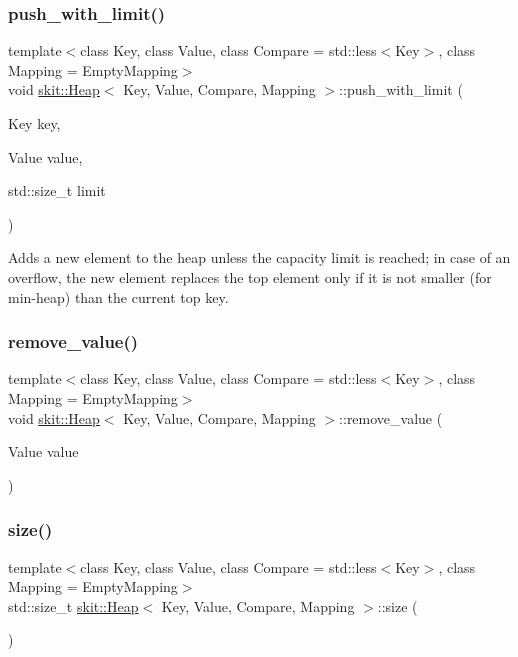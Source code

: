 \subsubsection{\texorpdfstring{push\+\_\+with\+\_\+limit()}{push\_with\_limit()}}
{\footnotesize\ttfamily template$<$class Key, class Value, class Compare = std\+::less$<$\+Key$>$, class Mapping = Empty\+Mapping$>$ \\
void \hyperlink{classskit_1_1Heap}{skit\+::\+Heap}$<$ Key, Value, Compare, Mapping $>$\+::push\+\_\+with\+\_\+limit (\begin{DoxyParamCaption}\item[{Key}]{key,  }\item[{Value}]{value,  }\item[{std\+::size\+\_\+t}]{limit }\end{DoxyParamCaption})\hspace{0.3cm}{\ttfamily [inline]}}

Adds a new element to the heap unless the capacity limit is reached; in case of an overflow, the new element replaces the top element only if it is not smaller (for min-\/heap) than the current top key. \mbox{\label{classskit_1_1Heap_abc4375c61acfca13fc1e7784aff5c140}} 
\subsubsection{\texorpdfstring{remove\+\_\+value()}{remove\_value()}}
{\footnotesize\ttfamily template$<$class Key, class Value, class Compare = std\+::less$<$\+Key$>$, class Mapping = Empty\+Mapping$>$ \\
void \hyperlink{classskit_1_1Heap}{skit\+::\+Heap}$<$ Key, Value, Compare, Mapping $>$\+::remove\+\_\+value (\begin{DoxyParamCaption}\item[{Value}]{value }\end{DoxyParamCaption})\hspace{0.3cm}{\ttfamily [inline]}}

\mbox{\label{classskit_1_1Heap_a2554aa9ba79c36a1b570ef1b7109b088}} 
\subsubsection{\texorpdfstring{size()}{size()}}
{\footnotesize\ttfamily template$<$class Key, class Value, class Compare = std\+::less$<$\+Key$>$, class Mapping = Empty\+Mapping$>$ \\
std\+::size\+\_\+t \hyperlink{classskit_1_1Heap}{skit\+::\+Heap}$<$ Key, Value, Compare, Mapping $>$\+::size (\begin{DoxyParamCaption}{ }\end{DoxyParamCaption})\hspace{0.3cm}{\ttfamily [inline]}}

